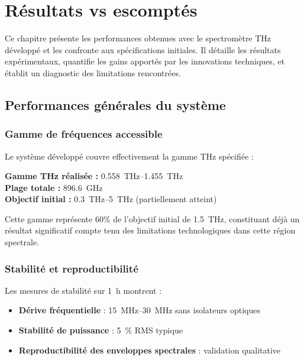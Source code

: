 
\chapter{Résultats vs escomptés}
\label{chap:resultats}

Ce chapitre présente les performances obtenues avec le spectromètre THz développé et les confronte aux spécifications initiales. Il détaille les résultats expérimentaux, quantifie les gains apportés par les innovations techniques, et établit un diagnostic des limitations rencontrées.

\section{Performances générales du système}

\subsection{Gamme de fréquences accessible}

Le système développé couvre effectivement la gamme THz spécifiée :

\begin{keyresult}
\textbf{Gamme THz réalisée :} \SIrange{0.558}{1.455}{\THz} \\
\textbf{Plage totale :} \SI{896.6}{\GHz} \\
\textbf{Objectif initial :} \SIrange{0.3}{5}{\THz} (partiellement atteint)
\end{keyresult}

Cette gamme représente 60\% de l'objectif initial de \SI{1.5}{\THz}, constituant déjà un résultat significatif compte tenu des limitations technologiques dans cette région spectrale.

\subsection{Stabilité et reproductibilité}

Les mesures de stabilité sur \SI{1}{\hour} montrent :
\begin{itemize}
    \item \textbf{Dérive fréquentielle} : \SIrange{15}{30}{\MHz} sans isolateurs optiques
    \item \textbf{Stabilité de puissance} : \SI{5}{\percent} RMS typique
    \item \textbf{Reproductibilité des enveloppes spectrales} : validation qualitative
\end{itemize}

